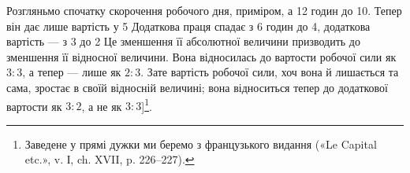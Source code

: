 Розгляньмо спочатку скорочення робочого дня, приміром,
а 12 годин до 10. Тепер він дає лише вартість у 5 Додаткова
праця спадає з 6 годин до 4, додаткова вартість — з 3
до 2 Це зменшення її абсолютної величини
призводить до зменшення її відносної величини. Вона відносилась
до вартости робочої сили як $3: 3$, а тепер — лише як $2: 3$. Зате
вартість робочої сили, хоч вона й лишається та сама, зростає
в своїй відносній величині; вона відноситься тепер до додаткової
вартости як $3: 2$, а не як $3: 3$]\footnote*{
Заведене у прямі дужки ми беремо з французького видання («Le
Capital etc.», v. І, ch. XVII, p. 226--227). 
}.
\parbreak{}  %
